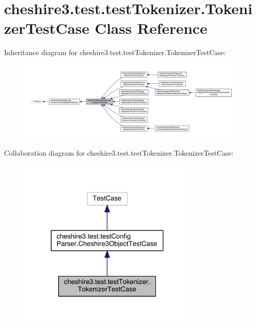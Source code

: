\hypertarget{classcheshire3_1_1test_1_1test_tokenizer_1_1_tokenizer_test_case}{\section{cheshire3.\-test.\-test\-Tokenizer.\-Tokenizer\-Test\-Case Class Reference}
\label{classcheshire3_1_1test_1_1test_tokenizer_1_1_tokenizer_test_case}
}


Inheritance diagram for cheshire3.\-test.\-test\-Tokenizer.\-Tokenizer\-Test\-Case\-:
\nopagebreak
\begin{figure}[H]
\begin{center}
\leavevmode
\includegraphics[width=350pt]{classcheshire3_1_1test_1_1test_tokenizer_1_1_tokenizer_test_case__inherit__graph}
\end{center}
\end{figure}


Collaboration diagram for cheshire3.\-test.\-test\-Tokenizer.\-Tokenizer\-Test\-Case\-:
\nopagebreak
\begin{figure}[H]
\begin{center}
\leavevmode
\includegraphics[width=246pt]{classcheshire3_1_1test_1_1test_tokenizer_1_1_tokenizer_test_case__coll__graph}
\end{center}
\end{figure}
